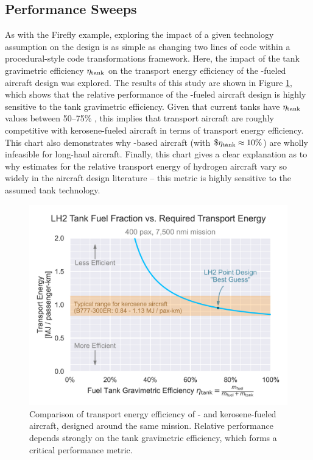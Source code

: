 \subsection{Performance Sweeps}

As with the Firefly example, exploring the impact of a given technology assumption on the design is as simple as changing two lines of code within a procedural-style code transformations framework. Here, the impact of the tank gravimetric efficiency $\eta_{\rm tank}$ on the transport energy efficiency of the \lh-fueled aircraft design was explored. The results of this study are shown in Figure \ref{fig:transport_energy}, which shows that the relative performance of the \lh-fueled aircraft design is highly sensitive to the tank gravimetric efficiency. Given that current tanks have $\eta_{\rm tank}$ values between 50--75\% \cite{brewer_hydrogen_1991}, this implies that \lh transport aircraft are roughly competitive with kerosene-fueled aircraft in terms of transport energy efficiency. This chart also demonstrates why \gh-based aircraft (with $\$\eta_{\rm tank} \approx 10\%$) are wholly infeasible for long-haul aircraft. Finally, this chart gives a clear explanation as to why estimates for the relative transport energy of hydrogen aircraft vary so widely in the aircraft design literature -- this metric is highly sensitive to the assumed tank technology.

\begin{figure}[H]
    \centering
    \includegraphics[width=\textwidth]{../figures/Hydrogen/ppt/media/image28.png}
    \caption{Comparison of transport energy efficiency of \lh- and kerosene-fueled aircraft, designed around the same mission. Relative performance depends strongly on the \lh tank gravimetric efficiency, which forms a critical performance metric.}
    \label{fig:transport_energy}
\end{figure}

